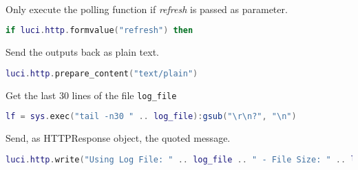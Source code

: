 \\
Only execute the polling function if \textit{refresh} is passed as parameter.
\begin{lstlisting}[language=lua]
if luci.http.formvalue("refresh") then
\end{lstlisting}

Send the outputs back as plain text.
\begin{lstlisting}[language=lua]
luci.http.prepare_content("text/plain")
\end{lstlisting}

Get the last 30 lines of the file \texttt{log\_file}
\begin{lstlisting}[language=lua]
lf = sys.exec("tail -n30 " .. log_file):gsub("\r\n?", "\n")
\end{lstlisting}

Send, as HTTPResponse object, the quoted message.
\begin{lstlisting}[language=lua]
luci.http.write("Using Log File: " .. log_file .. " - File Size: " .. log_size .. "\n" .. lf)
\end{lstlisting}
